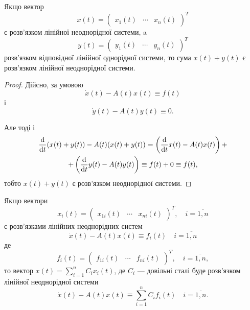 \setcounter{property}{0}
\begin{property}
	Якщо вектор 
	\begin{equation*}
		x(t) = \begin{pmatrix} x_1(t) & \cdots & x_n(t) \end{pmatrix}^T
	\end{equation*}
	є розв'язком лінійної неоднорідної системи, a 
	\begin{equation*}
		y(t) = \begin{pmatrix} y_1(t) & \cdots & y_n(t) \end{pmatrix}^T
	\end{equation*}
	розв'язком відповідної лінійної однорідної системи, то сума $x(t) + y(t)$ є розв'язком лінійної неоднорідної системи.
\end{property}

\begin{proof}
	Дійсно, за умовою
	\begin{equation*}
		\dot x(t) - A(t) x(t) \equiv f(t)
	\end{equation*}
	і
	\begin{equation*}
		\dot y(t) - A(t) y(t) \equiv 0.
	\end{equation*}

	Але тоді і
	\begin{multline*}
		\frac{\mathop{}\!\mathrm{d}}{\mathop{}\!\mathrm{d} t} (x(t) + y(t)) - A(t) (x(t) + y(t)) = \left( \frac{\mathop{}\!\mathrm{d}}{\mathop{}\!\mathrm{d} t} x(t) - A(t) x(t) \right) + \\
		+ \left( \frac{\mathop{}\!\mathrm{d}}{\mathop{}\!\mathrm{d} t} y(t) - A(t) y(t) \right) \equiv f(t) + 0 \equiv f(t),
	\end{multline*}
	тобто $x(t) + y(t)$ є розв'язком неоднорідної системи.
\end{proof}

\begin{property}
	Якщо вектори 
	\begin{equation*}
		x_i(t) = \begin{pmatrix} x_{1i}(t) & \cdots & x_{ni}(t) \end{pmatrix}^T, \quad i = \overline{1, n}
	\end{equation*}
	є розв'язками лінійних неоднорідних систем
	\begin{equation*}
		\dot x(t) - A(t) x(t) \equiv f_i(t) \quad i = \overline{1, n}
	\end{equation*}
	де 
	\begin{equation*}
		f_i(t) = \begin{pmatrix} f_{1i}(t) & \cdots & f_{ni}(t) \end{pmatrix}^T, \quad i = \overline{1, n},
	\end{equation*}
	то вектор $x(t) = \sum_{i = 1}^n C_i x_i(t)$, де $C_i$ --- довільні сталі буде розв'язком лінійної неоднорідної системи
	\begin{equation*}
		\dot x(t) - A(t) x(t) \equiv \sum_{i = 1}^n C_i f_i(t) \quad i = \overline{1, n}.
	\end{equation*}
\end{property}


